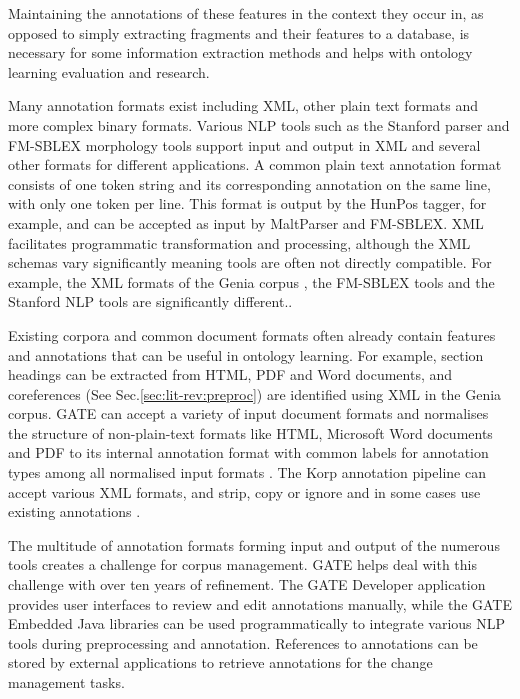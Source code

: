 \documentclass[a4paper]{report}
\newcommand{\todo}[1]{}
\begin{document}
Maintaining the annotations of these features in the context they occur in, as opposed to simply extracting fragments and their features to a database, is necessary for some information extraction methods\citep{Frantzi98CNCValue, NenadicEtAl02TermSim, Srikant95GenAssocRul} and helps with ontology learning evaluation and research.

Many annotation formats exist including XML, other plain text formats and more complex binary formats.
Various NLP tools such as the Stanford parser \citep{Marneffe06StanfPars} and FM-SBLEX morphology tools support input and output in XML and several other formats for different applications.
A common plain text annotation format consists of one token string and its corresponding annotation on the same line, with only one token per line.
This format is output by the HunPos tagger, for example, and can be accepted as input by MaltParser\citep{Nivre06maltparser} and FM-SBLEX.
XML facilitates programmatic transformation and processing, although the XML schemas vary significantly meaning tools are often not directly compatible.
For example, the XML formats of the Genia corpus \citep{KimEtAl03GeniaCorpus}, the FM-SBLEX tools and the Stanford NLP tools are significantly different.\todo{Add CoNLL format\citep{NivreEtAl07NoNLL} used by \citep{Nivre06maltparser}}.

Existing corpora and common document formats often already contain features and annotations that can be useful in ontology learning.
For example, section headings can be extracted from HTML, PDF and Word documents, and coreferences (See Sec.\ref{sec:lit-rev:preproc}) are identified using XML in the Genia corpus.
GATE can accept a variety of input document formats and normalises the structure of non-plain-text formats like HTML, Microsoft Word documents and PDF to its internal annotation format with common labels for annotation types among all normalised input formats \citep{Cunningham2011GATEBook}.
The Korp annotation pipeline can accept various XML formats, and strip, copy or ignore and in some cases use existing annotations \cite{Borin12Korp}.

The multitude of annotation formats forming input and output of the numerous tools creates a challenge for corpus management.
GATE helps deal with this challenge with over ten years of refinement.
The GATE Developer application provides user interfaces to review and edit annotations manually, while the GATE Embedded Java libraries can be used programmatically to integrate various NLP tools during preprocessing and annotation.
References to annotations can be stored by external applications to retrieve annotations for the change management tasks.
\end{document}
